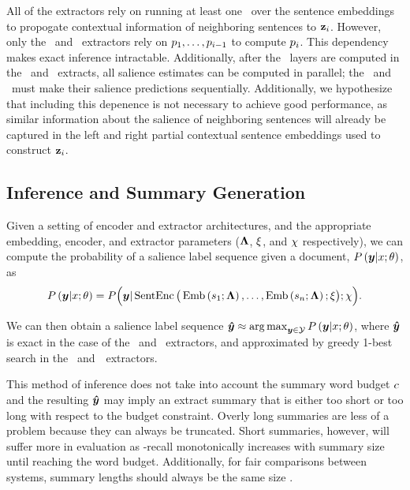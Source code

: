 All of the extractors rely on running at least one \gru~over the sentence 
embeddings to propogate contextual information of neighboring sentences
to $\mathbf{z}_i$. However, only the \clext~and \srext~extractors rely on 
$p_1,\ldots,p_{i-1}$ to compute $p_i$. This 
dependency makes exact inference
intractable. Additionally, after the \gru~layers are computed in the
\rnnext~and \stsext~extracts, all salience estimates can be computed in
parallel; the \clext~and \srext~must make their salience predictions 
sequentially.
Additionally, we hypothesize that including this depenence is not necessary to achieve good
performance, as similar information about the salience of neighboring sentences
will already be captured in the left and right partial contextual sentence
embeddings used to construct $\mathbf{z}_i$.

\subsection{Inference and Summary Generation} \label{sec:inference}

Given a setting of encoder and extractor architectures, and the appropriate
embedding, encoder, and extractor parameters ($\boldsymbol{\Lambda}$, $\xi$,
and $\chi$ respectively), we can compute the probability of a salience
label sequence given a document, $P\left(\boldsymbol{y}|x;\theta\right)$, as 
\[P\left(\boldsymbol{y}|x;\theta\right) = P\Big(\boldsymbol{y}|
\operatorname{SentEnc}\big(\operatorname{Emb}\left(s_1;\boldsymbol{\Lambda}\right),\ldots,\operatorname{Emb}\left(s_n;\boldsymbol{\Lambda}\right)  ;\xi\big);\chi\Big). \]

We can then obtain a salience label sequence 
$\boldsymbol{\hat{y}}\approx \operatorname*{arg\,max}_{\boldsymbol{y}\in\mathcal{Y}} P\left(\boldsymbol{y}|x;\theta\right)$, 
where $\boldsymbol{\hat{y}}$ is exact in the case of the \rnnext~and \stsext~extractors,
and approximated by greedy 1-best search in the \clext~and~\srext~extractors.

This method of inference does not take into account the summary
word budget $c$ and the resulting $\boldsymbol{\hat{y}}$ may imply an 
extract summary that is either too short or too long with respect to the 
budget constraint. Overly long summaries are less of a problem because they
can always be truncated. Short summaries, however, will suffer more in evaluation
as \rouge-recall monotonically increases with summary size until reaching the
word budget. Additionally, for fair comparisons between systems, summary lengths should always be the same size \citep{sumlen}.

